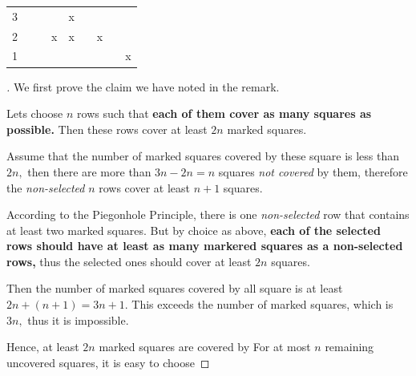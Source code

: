 \documentclass{article}
\begin{document}
\begin{table}[h]
\begin{tabular}{ccccccccc}
    \multicolumn{1}{c|}{3} & \multicolumn{1}{c|}{}  & \multicolumn{1}{c|}{}                         & \multicolumn{1}{c|}{}                         & \multicolumn{1}{c|}{x}                        & \multicolumn{1}{c|}{}                         & \multicolumn{1}{c|}{}                         & \multicolumn{1}{c|}{}                         & \multicolumn{1}{c|}{}                         \\ \cline{2-9} 
    \multicolumn{1}{c|}{2} & \multicolumn{1}{c|}{}  & \multicolumn{1}{c|}{}                         & \multicolumn{1}{c|}{x}                        & \multicolumn{1}{c|}{x}                        & \multicolumn{1}{c|}{}                         & \multicolumn{1}{c|}{x}                        & \multicolumn{1}{c|}{}                         & \multicolumn{1}{c|}{}                         \\ \cline{2-9} 
    \multicolumn{1}{c|}{1} & \multicolumn{1}{c|}{}  & \multicolumn{1}{c|}{}                         & \multicolumn{1}{c|}{}                         & \multicolumn{1}{c|}{}                         & \multicolumn{1}{c|}{}                         & \multicolumn{1}{c|}{}                         & \multicolumn{1}{c|}{}                         & \multicolumn{1}{c|}{x}                        \\ \cline{2-9} 
    \end{tabular}
\end{table}     

\begin{proof}[]
    We first prove the claim we have noted in the remark.
    
    \begin{claim*}
        Lets choose $n$ rows such that \textbf{each of them cover as many squares as possible.}
        Then these rows cover at least $2n$ marked squares.
    \end{claim*}
    
    \begin{subproof}
        Assume that the number of marked squares covered by these square is less than $2n,$
        then there are more than $3n-2n=n$ squares \textit{not covered} by them,
        therefore the \textit{non-selected} $n$ rows cover at least $n+1$ squares.

        According to the Piegonhole Principle, there is one \textit{non-selected} row
        that contains at least two marked squares.
        But by choice as above, \textbf{each of the selected rows should have at least as many markered squares
        as a non-selected rows,} thus the selected ones should cover at least $2n$ squares.

        Then the number of marked squares covered by all square is at least $2n+(n+1) = 3n+1.$
        This exceeds the number of marked squares, which is $3n,$ thus it is impossible.
    \end{subproof}

    Hence, at least $2n$ marked squares are covered by 
    For at most $n$ remaining uncovered squares, it is easy to choose 
\end{proof}
\end{document}
